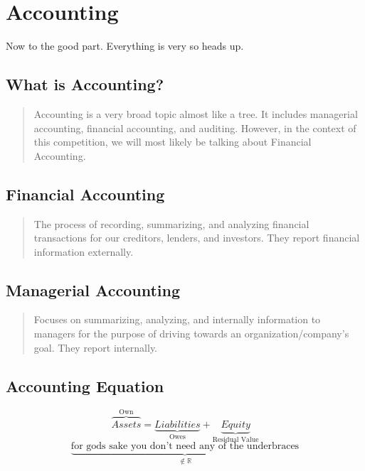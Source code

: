 \chapter{Accounting}
\label{sec:Accounting}
Now to the good part. Everything is very  so heads up. 


\section*{What is Accounting?}
\begin{quote}
    Accounting is a very broad topic almost like a tree. 
    It includes managerial accounting, financial accounting, and auditing.
    However, in the context of this competition, we will most likely be talking about Financial Accounting.  
\end{quote}

\section*{Financial Accounting}
\begin{quote}
    The process of recording, summarizing, 
    and analyzing financial transactions for our creditors, lenders, and investors. 
    They report financial information externally. 
\end{quote}

\section*{Managerial Accounting}
\begin{quote}
    Focuses on summarizing, analyzing, and internally information
    to managers for the purpose of driving towards an organization/company's goal.
    They report internally.
\end{quote}

\newpage
\section{Accounting Equation}
\begin{equation}
    \overbrace{Assets}^\text{Own} = \underbrace{Liabilities}_\text{Owes} + 
                                \underbrace{Equity}_\text{Residual Value}
\end{equation}
\begin{equation}
    \underbrace{\text{for gods sake you don't need any of the underbraces}}_{\not\in \mathbb{R}}
\end{equation}

